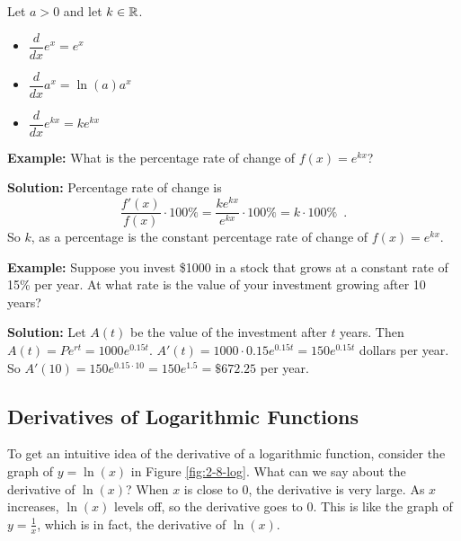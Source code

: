 \begin{theorem}
Let $a>0$ and let $k\in\mathbb{R}$.
\begin{itemize}
    \item $\displaystyle\dfrac{d}{dx}e^x=e^x$
    \item $\displaystyle\dfrac{d}{dx}a^x=\ln(a)a^x$
    \item $\displaystyle\dfrac{d}{dx}e^{kx} = ke^{kx}$
 \end{itemize}
\end{theorem}

{\bf Example: } What is the percentage rate of change of $f(x) = e^{kx}$?

{\bf Solution: } Percentage rate of change is 
$$\frac{f'(x)}{f(x)}\cdot 100\% = \frac{ke^{kx}}{e^{kx}}\cdot 100\% = k\cdot 100\% \enspace .$$
So $k$, as a percentage is the constant percentage rate of change of $f(x) = e^{kx}$. 

{\bf Example: } Suppose you invest \$1000 in a stock that grows at a constant rate of 15\% per year. At what rate is the value of your investment growing after 10 years?

{\bf Solution: } Let $A(t)$ be the value of the investment after $t$ years. Then $A(t) = Pe^{rt} = 1000e^{0.15t}$. $A'(t) = 1000\cdot 0.15e^{0.15t} = 150e^{0.15t}$ dollars per year. So $A'(10) = 150e^{0.15\cdot 10} = 150e^{1.5} = \$672.25$ per year.



\subsection{Derivatives of Logarithmic Functions}


To get an intuitive idea of the derivative of a logarithmic function, consider the graph of $y=\ln(x)$ in Figure \ref{fig:2-8-log}. What can we say about the derivative of $\ln(x)$? When $x$ is close to 0, the derivative is very large. As $x$ increases, $\ln(x)$ levels off, so the derivative goes to $0$. This is like the graph of $y=\frac{1}{x}$, which is in fact, the derivative of $\ln(x)$.

